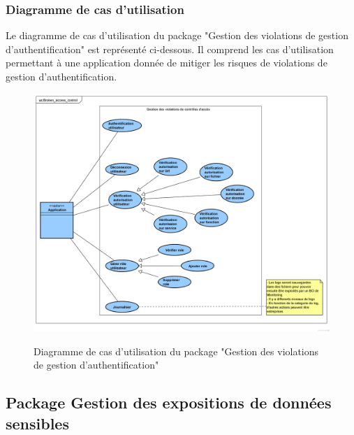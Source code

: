 \subsubsection{Diagramme de cas d'utilisation}
Le diagramme de cas d'utilisation du package "Gestion des violations de gestion d'authentification" est représenté ci-dessous. Il comprend les cas d'utilisation permettant à une application donnée de mitiger les risques de violations de gestion d'authentification.\\ 
\begin{figure}[H]
	\centering
	\begin{minipage}{14cm}
		{\includegraphics[width=1\textwidth,height=0.40\textheight]{fig/Violation-gestion-authentification-use-case-diagram.png}}
	\end{minipage}
	\caption{Diagramme de cas d'utilisation du package "Gestion des violations de gestion d'authentification"}
	\label{fig:7.3}
\end{figure}

\subsection{Package Gestion des expositions de données sensibles}

